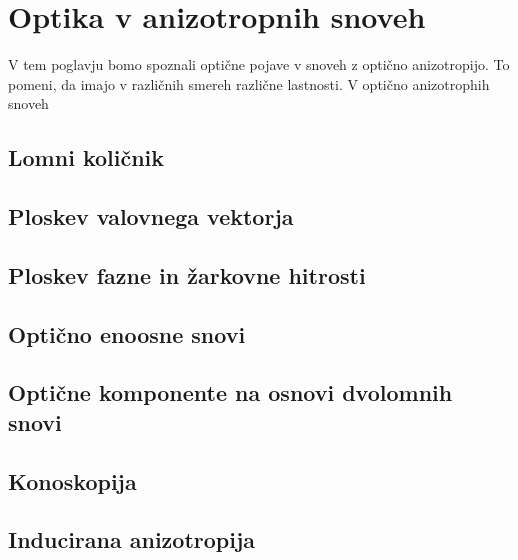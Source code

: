 
\chapter{Optika v anizotropnih snoveh}
V tem poglavju bomo spoznali optične pojave v snoveh z optično anizotropijo. To
pomeni, da imajo v različnih smereh različne lastnosti. V optično anizotrophih
snoveh


\section{Lomni količnik}
\section{Ploskev valovnega vektorja}
\section{Ploskev fazne in žarkovne hitrosti}
\section{Optično enoosne snovi}
\section{Optične komponente na osnovi dvolomnih snovi}
\section{Konoskopija}
\section{Inducirana anizotropija}

